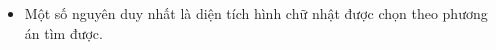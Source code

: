 \begin{itemize}
	\item Một số nguyên duy nhất là diện tích hình chữ nhật được chọn theo phương án tìm được.
\end{itemize}